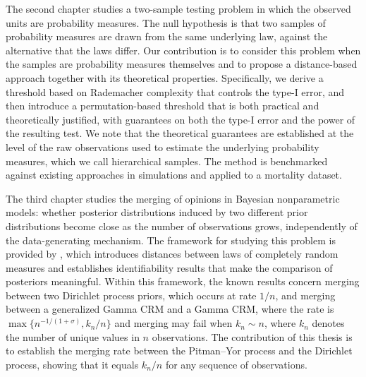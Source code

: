The second chapter studies a two-sample testing problem in which the observed units are probability measures. The null hypothesis is that two samples of probability measures are drawn from the same underlying law, against the alternative that the laws differ. Our contribution is to consider this problem when the samples are probability measures themselves and to propose a distance-based approach together with its theoretical properties. Specifically, we derive a threshold based on Rademacher complexity that controls the type-I error, and then introduce a permutation-based threshold that is both practical and theoretically justified, with guarantees on both the type-I error and the power of the resulting test. We note that the theoretical guarantees are established at the level of the raw observations used to estimate the underlying probability measures, which we call hierarchical samples. The method is benchmarked against existing approaches in simulations and applied to a mortality dataset.

The third chapter studies the merging of opinions in Bayesian nonparametric models: whether posterior distributions induced by two different prior distributions become close as the number of observations grows, independently of the data-generating mechanism. The framework for studying this problem is provided by \cite{catalano2026merging}, which introduces distances between laws of completely random measures and establishes identifiability results that make the comparison of posteriors meaningful. Within this framework, the known results concern merging between two Dirichlet process priors, which occurs at rate $1/n$, and merging between a generalized Gamma CRM and a Gamma CRM, where the rate is $\max\{n^{-1/(1+\sigma)}, k_n/n\}$ and merging may fail when $k_n \sim n$, where $k_n$ denotes the number of unique values in $n$ observations. The contribution of this thesis is to establish the merging rate between the Pitman--Yor process and the Dirichlet process, showing that it equals $k_n/n$ for any sequence of observations.
